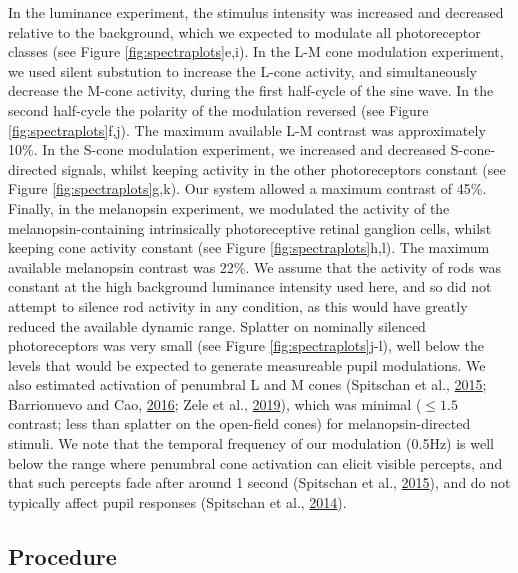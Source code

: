 \documentclass[
]{article}
\begin{document}
In the luminance experiment, the stimulus intensity was increased and decreased relative to the background, which we expected to modulate all photoreceptor classes (see Figure \ref{fig:spectraplots}e,i). In the L-M cone modulation experiment, we used silent substution to increase the L-cone activity, and simultaneously decrease the M-cone activity, during the first half-cycle of the sine wave. In the second half-cycle the polarity of the modulation reversed (see Figure \ref{fig:spectraplots}f,j). The maximum available L-M contrast was approximately 10\%. In the S-cone modulation experiment, we increased and decreased S-cone-directed signals, whilst keeping activity in the other photoreceptors constant (see Figure \ref{fig:spectraplots}g,k). Our system allowed a maximum contrast of 45\%. Finally, in the melanopsin experiment, we modulated the activity of the melanopsin-containing intrinsically photoreceptive retinal ganglion cells, whilst keeping cone activity constant (see Figure \ref{fig:spectraplots}h,l). The maximum available melanopsin contrast was 22\%. We assume that the activity of rods was constant at the high background luminance intensity used here, and so did not attempt to silence rod activity in any condition, as this would have greatly reduced the available dynamic range. Splatter on nominally silenced photoreceptors was very small (see Figure \ref{fig:spectraplots}j-l), well below the levels that would be expected to generate measureable pupil modulations. We also estimated activation of penumbral L and M cones (Spitschan et al., \protect\hyperlink{ref-Spitschan2015}{2015}; Barrionuevo and Cao, \protect\hyperlink{ref-Barrionuevo2016}{2016}; Zele et al., \protect\hyperlink{ref-Zele2019}{2019}), which was minimal (\(\le 1.5%
\) contrast; less than splatter on the open-field cones) for melanopsin-directed stimuli. We note that the temporal frequency of our modulation (0.5Hz) is well below the range where penumbral cone activation can elicit visible percepts, and that such percepts fade after around 1 second (Spitschan et al., \protect\hyperlink{ref-Spitschan2015}{2015}), and do not typically affect pupil responses (Spitschan et al., \protect\hyperlink{ref-Spitschan2014}{2014}).

\hypertarget{procedure}{%
\subsection{Procedure}\label{procedure}}
\end{document}
